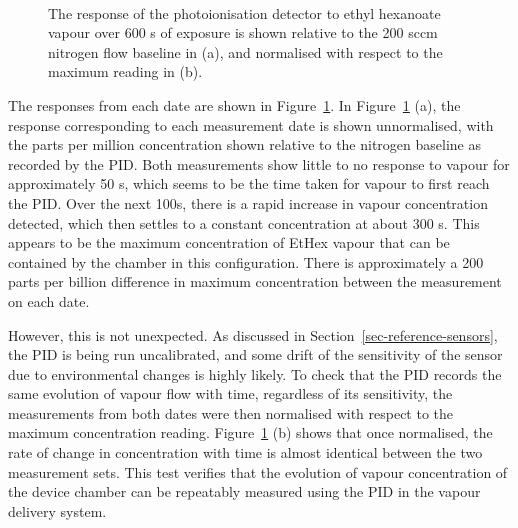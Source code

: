 \documentclass[
  a4paper,
]{scrbook}
\begin{document}
\begin{figure}
\begin{minipage}[t]{0.70\linewidth}
{}

\end{minipage}%
%
\begin{minipage}[t]{0.15\linewidth}

{\centering 

~

}

\end{minipage}%

\caption{\label{fig-PID-EtHex-response}The response of the
photoionisation detector to ethyl hexanoate vapour over 600 s of
exposure is shown relative to the 200 sccm nitrogen flow baseline in
(a), and normalised with respect to the maximum reading in (b).}

\end{figure}

The responses from each date are shown in
Figure~\ref{fig-PID-EtHex-response}. In
Figure~\ref{fig-PID-EtHex-response} (a), the response corresponding to
each measurement date is shown unnormalised, with the parts per million
concentration shown relative to the nitrogen baseline as recorded by the
PID. Both measurements show little to no response to vapour for
approximately 50 s, which seems to be the time taken for vapour to first
reach the PID. Over the next 100s, there is a rapid increase in vapour
concentration detected, which then settles to a constant concentration
at about 300 s. This appears to be the maximum concentration of EtHex
vapour that can be contained by the chamber in this configuration. There
is approximately a 200 parts per billion difference in maximum
concentration between the measurement on each date.

However, this is not unexpected. As discussed in
Section~\ref{sec-reference-sensors}, the PID is being run uncalibrated,
and some drift of the sensitivity of the sensor due to environmental
changes is highly likely. To check that the PID records the same
evolution of vapour flow with time, regardless of its sensitivity, the
measurements from both dates were then normalised with respect to the
maximum concentration reading. Figure~\ref{fig-PID-EtHex-response} (b)
shows that once normalised, the rate of change in concentration with
time is almost identical between the two measurement sets. This test
verifies that the evolution of vapour concentration of the device
chamber can be repeatably measured using the PID in the vapour delivery
system.
\end{document}
